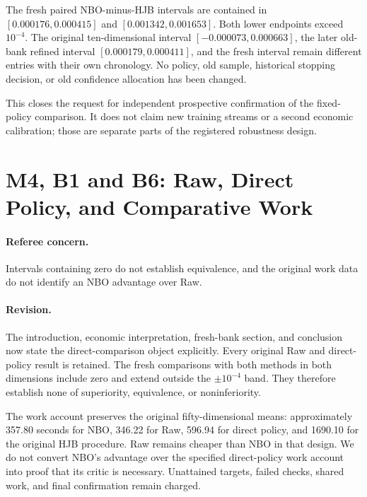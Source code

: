 The fresh paired NBO-minus-HJB intervals are contained in $[0.000176,0.000415]$ and $[0.001342,0.001653]$. Both lower endpoints exceed $10^{-4}$. The original ten-dimensional interval $[-0.000073,0.000663]$, the later old-bank refined interval $[0.000179,0.000411]$, and the fresh interval remain different entries with their own chronology. No policy, old sample, historical stopping decision, or old confidence allocation has been changed.

This closes the request for independent prospective confirmation of the fixed-policy comparison. It does not claim new training streams or a second economic calibration; those are separate parts of the registered robustness design.

\section{M4, B1 and B6: Raw, Direct Policy, and Comparative Work}
\paragraph*{Referee concern.} Intervals containing zero do not establish equivalence, and the original work data do not identify an NBO advantage over Raw.

\paragraph*{Revision.} The introduction, economic interpretation, fresh-bank section, and conclusion now state the direct-comparison object explicitly. Every original Raw and direct-policy result is retained. The fresh comparisons with both methods in both dimensions include zero and extend outside the $\pm10^{-4}$ band. They therefore establish none of superiority, equivalence, or noninferiority.

The work account preserves the original fifty-dimensional means: approximately 357.80 seconds for NBO, 346.22 for Raw, 596.94 for direct policy, and 1690.10 for the original HJB procedure. Raw remains cheaper than NBO in that design. We do not convert NBO's advantage over the specified direct-policy work account into proof that its critic is necessary. Unattained targets, failed checks, shared work, and final confirmation remain charged.

